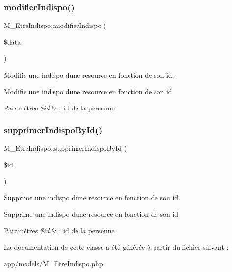 \subsubsection{\texorpdfstring{modifier\+Indispo()}{modifierIndispo()}}
{\footnotesize\ttfamily M\+\_\+\+Etre\+Indispo\+::modifier\+Indispo (\begin{DoxyParamCaption}\item[{}]{\$data }\end{DoxyParamCaption})}



Modifie une indispo d\textquotesingle{}une resource en fonction de son id. 

Modifie une indispo d\textquotesingle{}une resource en fonction de son id 
\begin{DoxyParams}{Paramètres}
{\em \$id} & \+: id de la personne \\
\hline
\end{DoxyParams}
\mbox{\label{class_m___etre_indispo_a46bb4b8f17279202d251337ef4fe81be}} 
\subsubsection{\texorpdfstring{supprimer\+Indispo\+By\+Id()}{supprimerIndispoById()}}
{\footnotesize\ttfamily M\+\_\+\+Etre\+Indispo\+::supprimer\+Indispo\+By\+Id (\begin{DoxyParamCaption}\item[{}]{\$id }\end{DoxyParamCaption})}



Supprime une indispo d\textquotesingle{}une resource en fonction de son id. 

Supprime une indispo d\textquotesingle{}une resource en fonction de son id 
\begin{DoxyParams}{Paramètres}
{\em \$id} & \+: id de la personne \\
\hline
\end{DoxyParams}


La documentation de cette classe a été générée à partir du fichier suivant \+:\begin{DoxyCompactItemize}
\item 
app/models/\hyperlink{_m___etre_indispo_8php}{M\+\_\+\+Etre\+Indispo.\+php}\end{DoxyCompactItemize}

